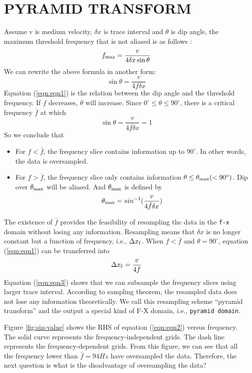 \section{PYRAMID TRANSFORM}
\par
Assume v is medium velocity, $\delta x$ is trace interval and $\theta$ is 
dip angle, the maximum threshold frequency that is not aliased is as follows
\cite{SDP00.00.00090522}:
\begin{equation}
        f_{\rm max} = \frac{v}{4\delta x \sin\theta}
\end{equation}
We can rewrite the above formula in another form:
\begin{equation}
        \sin\theta = \frac{v}{4f \delta x} 
\label{eqn:eqn1}
\end{equation}
Equation (\ref{eqn:eqn1}) is the relation between the dip angle and  
the threshold frequency. If $f$ decreases, $\theta$ will increase. 
Since $0^\circ \le \theta \le 90^\circ$, there is a critical frequency 
$\bar{f}$ at which
\begin{equation}  
        \sin\theta = \frac{v}{4\bar{f}\delta x} = 1
\label{eqn:eqn2}
\end{equation}
So we conclude that 
\begin{itemize}
	\item For $f<\bar{f}$, the frequency slice contains information up to 
$90^\circ$. In other words, the data is oversampled. 
	\item For $f>\bar{f}$, the frequency slice only contains information 
$\theta \le \theta_{\rm max} (<90^\circ)$. Dip over $\theta_{\rm max}$ will be  
aliased. And $\theta_{\rm max}$ is defined by
$$
	\theta_{\rm max} = sin^{-1}(\frac{v}{4\bar{f}\delta x})
$$
\end{itemize}
The existence of $\bar{f}$ provides the feasibility of resampling the data in 
the {\tt f-x} domain without losing any information. Resampling means that 
$\delta x$ is no longer constant but a function of frequency, i.e., 
$\Delta x_{\rm f}$. When $f<\bar{f}$ and $\theta=90^\circ$, equation 
(\ref{eqn:eqn1}) can be transferred into 
\begin{equation}
	\Delta x_{\rm f} = \frac{v}{4f}
\label{eqn:eqn3}
\end{equation}
Equation (\ref{eqn:eqn3}) shows that we can subsample the frequency slices using 
larger trace interval. According to sampling theorem, the resampled data 
does not lose any information theoretically. 
We call this resampling scheme ``pyramid transform'' and the output a special 
kind of F-X domain, i.e., {\tt pyramid domain}. 
\par
Figure \ref{fig:sin-value} shows the RHS of equation (\ref{eqn:eqn2}) versus frequency. 
The solid curve represents the frequency-independent grids. 
The dash line represents the frequency-dependent grids. 
From this figure, we can see that all the frequency lower than $\bar{f}=94Hz$ 
have oversampled the data. Therefore, the next question is what is the 
disadvantage of oversampling the data?

